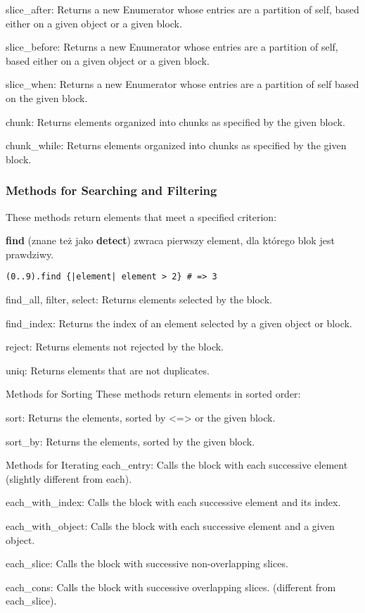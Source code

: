 slice\_after: Returns a new Enumerator whose entries are a partition of self, based either on a given object or a given block.

slice\_before: Returns a new Enumerator whose entries are a partition of self, based either on a given object or a given block.

slice\_when: Returns a new Enumerator whose entries are a partition of self based on the given block.

chunk: Returns elements organized into chunks as specified by the given block.

chunk\_while: Returns elements organized into chunks as specified by the given block.

\subsubsection{Methods for Searching and Filtering}
These methods return elements that meet a specified criterion:

\textbf{find} (znane też jako \textbf{detect}) zwraca pierwszy element, dla którego blok jest prawdziwy.
\begin{verbatim}
(0..9).find {|element| element > 2} # => 3
\end{verbatim}

find\_all, filter, select: Returns elements selected by the block.

find\_index: Returns the index of an element selected by a given object or block.

reject: Returns elements not rejected by the block.

uniq: Returns elements that are not duplicates.

Methods for Sorting
These methods return elements in sorted order:

sort: Returns the elements, sorted by <=> or the given block.

sort\_by: Returns the elements, sorted by the given block.

Methods for Iterating
each\_entry: Calls the block with each successive element (slightly different from each).

each\_with\_index: Calls the block with each successive element and its index.

each\_with\_object: Calls the block with each successive element and a given object.

each\_slice: Calls the block with successive non-overlapping slices.

each\_cons: Calls the block with successive overlapping slices. (different from each\_slice).

